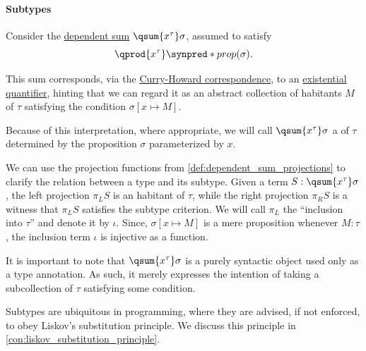 \paragraph{Subtypes}

\begin{definition}\label{def:dependent_subtype}
  Consider the \hyperref[def:dependent_sum]{dependent sum} \( \qsum {x^\tau} \sigma \), assumed to satisfy
  \begin{equation}\label{eq:def:dependent_subtype}
    \qprod {x^\tau} \synpred*{prop}(\sigma).
  \end{equation}

  This sum corresponds, via the \hyperref[con:curry_howard_correspondence]{Curry-Howard correspondence}, to an \hyperref[def:predicate_logic_alphabet/quantifiers/existential]{existential quantifier}, hinting that we can regard it as an abstract collection of habitants \( M \) of \( \tau \) satisfying the condition \( \sigma[x \mapsto M] \).

  Because of this interpretation, where appropriate, we will call \( \qsum {x^\tau} \sigma \) a  of \( \tau \) determined by the proposition \( \sigma \) parameterized by \( x \).

  We can use the projection functions from \cref{def:dependent_sum_projections} to clarify the relation between a type and its subtype. Given a term \( S: \qsum {x^\tau} \sigma \), the left projection \( \pi_L S \) is an habitant of \( \tau \), while the right projection \( \pi_R S \) is a witness that \( \pi_L S \) satisfies the subtype criterion. We will call \( \pi_L \) the \enquote{inclusion into \( \tau \)} and denote it by \( \iota \). Since, \( \sigma[x \mapsto M] \) is a mere proposition whenever \( M: \tau \), the inclusion term \( \iota \) is injective as a function.
\end{definition}
\begin{comments}
  \item It is important to note that \( \qsum {x^\tau} \sigma \) is a purely syntactic object used only as a type annotation. As such, it merely expresses the intention of taking a subcollection of \( \tau \) satisfying some condition.

  \item Subtypes are ubiquitous in programming, where they are advised, if not enforced, to obey Liskov's substitution principle. We discuss this principle in \cref{con:liskov_substitution_principle}.
\end{comments}

